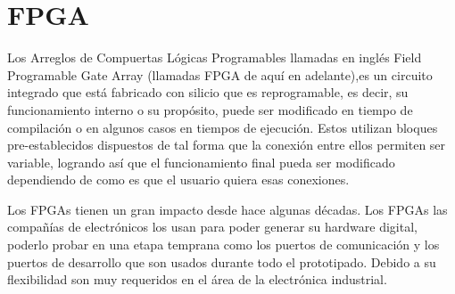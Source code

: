 \documentclass[twoside,spanish,ESP,MSc]{plantillaLabUPV}
\theoremstyle{definition}
\begin{document}
%





\section{FPGA}
Los Arreglos de Compuertas Lógicas Programables llamadas en inglés Field Programable Gate Array (llamadas FPGA de aquí en adelante),es un circuito integrado que está fabricado con silicio que es reprogramable, es decir, su funcionamiento interno o su propósito, puede ser modificado en tiempo de compilación o en algunos casos en tiempos de ejecución. Estos utilizan bloques pre-establecidos dispuestos de tal forma que la conexión entre ellos permiten ser variable, logrando así que el funcionamiento final pueda ser modificado dependiendo de como es que el usuario quiera esas conexiones.

Los FPGAs tienen un gran impacto desde hace algunas décadas. Los FPGAs las compañías de electrónicos los usan para poder generar su hardware digital, poderlo probar en una etapa temprana como los puertos de comunicación y los puertos de desarrollo que son usados durante todo el prototipado. Debido a su flexibilidad son muy requeridos en el área de la electrónica industrial. 
\end{document}
